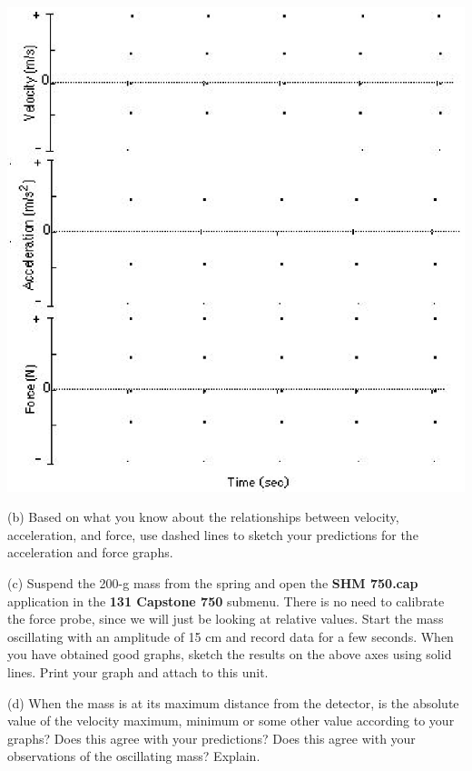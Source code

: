 \vspace{0.3cm}
{\par\centering \includegraphics{periodic_motion/periodic_motion_fig3.eps} \par}

(b) Based on what you know about the relationships between velocity, 
acceleration, and force, use dashed lines to sketch your predictions for the 
acceleration and force graphs.

(c) Suspend the 200-g mass from the spring and open the \textbf{SHM 750.cap} application in the \textbf{131 Capstone 750} submenu. There is no need to calibrate the force probe, since we will just be looking at relative values. Start the mass oscillating with an amplitude of 15 cm and record data for a few seconds.
When you have obtained good graphs, sketch the results on the above axes using
solid lines. Print your graph and attach to this unit.

(d) When the mass is at its maximum distance from the detector, is the absolute
 value of the velocity
maximum, minimum or some other value according to your graphs? Does this agree
with your predictions? Does this agree with your observations of the oscillating
mass? Explain.
\answerspace{15mm}

